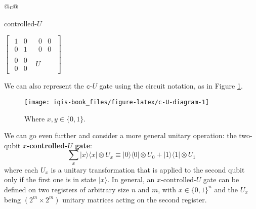 \documentclass[fleqn]{article}
\newenvironment{idea}{\noindent}{\medskip}
\begin{document}
\begin{idea}

\begin{longtable}[]{@{}c@{}}
\toprule
\begin{minipage}[b]{0.97\columnwidth}\centering
controlled-\(U\)\strut
\end{minipage}\tabularnewline
\midrule
\endhead
\begin{minipage}[t]{0.97\columnwidth}\centering
\(\left[\begin{array}{c|c}\begin{matrix}1&0\\0&1\end{matrix}&\begin{matrix}0&0\\0&0\end{matrix}\\\hline\begin{matrix}0&0\\0&0\end{matrix}&U\end{array}\right]\)\strut
\end{minipage}\tabularnewline
\bottomrule
\end{longtable}


\end{idea}

We can also represent the \(\texttt{c-}U\) gate using the circuit notation, as in Figure \ref{fig:c-U-diagram}.



\begin{figure}[H]

{\centering \texttt{[image: iqis-book\_files/figure-latex/c-U-diagram-1]} 

}

\caption{Where \(x,y\in\{0,1\}\).}\label{fig:c-U-diagram}
\end{figure}

We can go even further and consider a more general unitary operation: the two-qubit \textbf{\(x\)-controlled-\(U\) gate}:
\[
  \sum_x |x\rangle\langle x|\otimes U_x
  \equiv
  |0\rangle\langle 0|\otimes U_0 + |1\rangle\langle 1|\otimes U_1
\]
where each \(U_x\) is a unitary transformation that is applied to the second qubit only if the first one is in state \(|x\rangle\).
In general, an \(x\)-controlled-\(U\) gate can be defined on two registers of arbitrary size \(n\) and \(m\), with \(x\in\{0,1\}^n\) and the \(U_x\) being \((2^m\times 2^m)\) unitary matrices acting on the second register.
\end{document}
